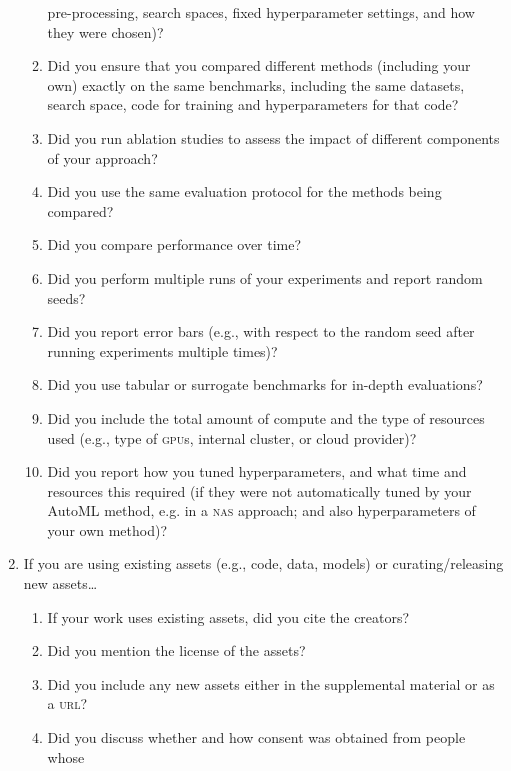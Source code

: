 \documentclass[11pt]{article}
\begin{document}
\begin{enumerate}
\begin{enumerate}
    pre-processing, search spaces, fixed hyperparameter settings, and how they
    were chosen)?
    \answerTODO{}
  \item Did you ensure that you compared different methods (including your own)
    exactly on the same benchmarks, including the same datasets, search space,
    code for training and hyperparameters for that code?
    \answerTODO{}
  \item Did you run ablation studies to assess the impact of different
    components of your approach?
    \answerTODO{}
  \item Did you use the same evaluation protocol for the methods being compared?
    \answerTODO{}
  \item Did you compare performance over time?
    \answerTODO{}
  \item Did you perform multiple runs of your experiments and report random seeds?
    \answerTODO{}
  \item Did you report error bars (e.g., with respect to the random seed after
    running experiments multiple times)?
    \answerTODO{}
  \item Did you use tabular or surrogate benchmarks for in-depth evaluations?
    \answerTODO{}
  \item Did you include the total amount of compute and the type of resources
    used (e.g., type of \textsc{gpu}s, internal cluster, or cloud provider)?
    \answerTODO{}
  \item Did you report how you tuned hyperparameters, and what time and
    resources this required (if they were not automatically tuned by your AutoML
    method, e.g. in a \textsc{nas} approach; and also hyperparameters of your
    own method)?
    \answerTODO{}
  \end{enumerate}
\item If you are using existing assets (e.g., code, data, models) or
  curating/releasing new assets\dots
  \begin{enumerate}
  \item If your work uses existing assets, did you cite the creators?
    \answerTODO{}
  \item Did you mention the license of the assets?
    \answerTODO{}
  \item Did you include any new assets either in the supplemental material or as
    a \textsc{url}?
    \answerTODO{}
  \item Did you discuss whether and how consent was obtained from people whose

\end{enumerate}
\end{enumerate}
\end{document}
